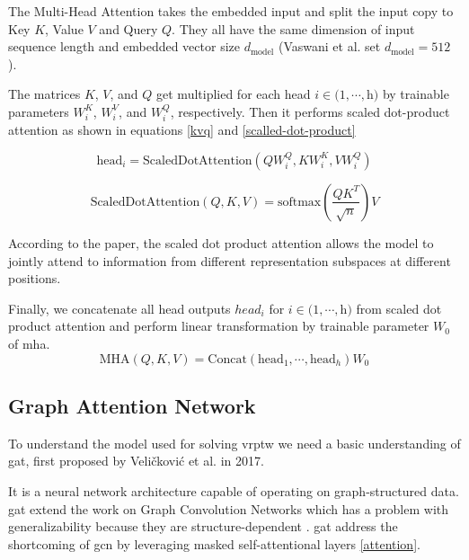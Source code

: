             The Multi-Head Attention takes the embedded input and split the input copy to Key $K$, Value $V$ and Query $Q$. They all have the same dimension of input sequence length and embedded vector size $d_{\text{model}}$ (Vaswani et al. set $d_{\text{model}}=512$ \cite{attention-is-all}).
            
            The matrices $K$, $V$, and $Q$ get multiplied for each head $i \in (1, \cdots, $h$)$ by trainable parameters $W_i^K$, $W_i^V$, and $W_i^Q$, respectively. Then it performs scaled dot-product attention as shown in equations \ref{kvq} and \ref{scalled-dot-product}
            
            \begin{equation}\label{kvq}
                \text{head}_i = \text{ScaledDotAttention}(Q W_i^Q, K W_i^K, V W_i^Q)
            \end{equation}
            
            \begin{equation}\label{scalled-dot-product}
                \text{ScaledDotAttention}(Q, K, V) = \text{softmax}(\dfrac{Q K^T}{\sqrt{n}}) V
            \end{equation}
            
            According to the paper\cite{attention-is-all}, the scaled dot product attention allows the model to jointly attend to information from different representation subspaces at different positions.
            
            Finally, we concatenate all head outputs $head_i$ for $i \in (1, \cdots, $h$)$ from scaled dot product attention and perform linear transformation by trainable parameter $W_0$ of \gls{mha}.
            \begin{equation}
                \text{MHA}(Q, K, V) = \text{Concat}(\text{head}_1, \cdots, \text{head}_h)W_0
            \end{equation}
            
        \subsection{Graph Attention Network}\label{graph-attention-network}
        To understand the model used for solving \gls{vrptw} we need a basic understanding of \gls{gat}, first proposed by Veličković et al. \cite{gat} in 2017.
        
        It is a neural network architecture capable of operating on graph-structured data. \gls{gat} extend the work on Graph Convolution Networks \cite{gcn} which has a problem with generalizability because they are structure-dependent \cite{dgl-gat}. \gls{gat} address the shortcoming of \gls{gcn} by leveraging masked self-attentional layers \ref{attention}.
        
